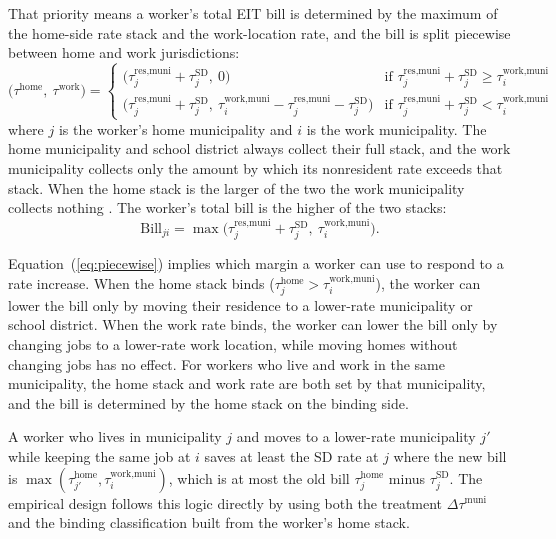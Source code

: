 \documentclass[12pt]{article}
\begin{document}
That priority means a worker's total EIT bill
is determined by the maximum of the home-side rate stack and the
work-location rate, and the bill is split piecewise
between home and work jurisdictions:
%
\begin{equation}
\bigl(\tau^{\text{home}},\ \tau^{\text{work}}\bigr) =
\begin{cases}
\bigl(\tau^{\text{res,muni}}_j + \tau^{\text{SD}}_j,\ 0\bigr)
   & \text{if } \tau^{\text{res,muni}}_j + \tau^{\text{SD}}_j \geq \tau^{\text{work,muni}}_i \\[4pt]
\bigl(\tau^{\text{res,muni}}_j + \tau^{\text{SD}}_j,\ \tau^{\text{work,muni}}_i - \tau^{\text{res,muni}}_j - \tau^{\text{SD}}_j\bigr)
   & \text{if } \tau^{\text{res,muni}}_j + \tau^{\text{SD}}_j < \tau^{\text{work,muni}}_i
\end{cases}
\label{eq:piecewise}
\end{equation}
%
where $j$ is the worker's home municipality and $i$ is the work municipality.
The home municipality and school district always collect their full
stack, and the work municipality collects only the amount by which its
nonresident rate exceeds that stack.
When the home stack is the larger of the two the work municipality collects
nothing
\citep{paDeskbook2025}. The worker's total bill is the higher of the two stacks:
%
\begin{equation}
\text{Bill}_{ji} = \max\!\bigl(\tau^{\text{res,muni}}_j + \tau^{\text{SD}}_j,\ \tau^{\text{work,muni}}_i\bigr).
\label{eq:bill}
\end{equation}

Equation~(\ref{eq:piecewise}) implies which margin a worker can use to
respond to a rate increase. When the home stack binds
($\tau^{\text{home}}_j > \tau^{\text{work,muni}}_i$), the worker can lower
the bill only by moving their residence to a lower-rate municipality or school district.
When the work rate binds, the worker can lower the bill
only by changing jobs to a lower-rate work location, while moving homes
without changing jobs has no effect. For workers who live and work in
the same municipality, the home stack and work rate are both set by that municipality, and the bill is determined by the home stack on the binding side.

A worker who lives in municipality $j$ and moves to a lower-rate municipality $j'$
while keeping the same job at $i$ saves at least the SD rate at $j$ where
the new bill is $\max(\tau^{\text{home}}_{j'}, \tau^{\text{work,muni}}_i)$,
which is at most the old bill $\tau^{\text{home}}_j$ minus
$\tau^{\text{SD}}_j$. The empirical design follows this logic directly by using both the treatment
$\Delta\tau^{\text{muni}}$ and the binding classification
built from the worker's home stack. 
\end{document}
